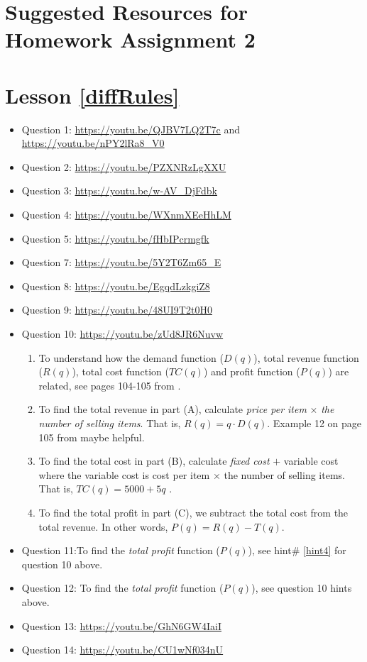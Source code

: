 \section*{Suggested Resources for Homework Assignment 2}
\section*{Lesson \ref{diffRules}}
\begin{itemize}[leftmargin=*]
    \item Question 1: \url{https://youtu.be/QJBV7LQ2T7c} and \url{https://youtu.be/nPY2lRa8_V0}
    \item Question 2: \url{https://youtu.be/PZXNRzLgXXU}
    \item Question 3: \url{https://youtu.be/w-AV_DjFdbk} 
    \item Question 4: \url{https://youtu.be/WXnmXEeHhLM}
    \item Question 5: \url{https://youtu.be/fHbIPcrmgfk}
    \item Question 7: \url{https://youtu.be/5Y2T6Zm65_E}
    \item Question 8: \url{https://youtu.be/EgqdLzkgiZ8}
    \item Question 9: \url{https://youtu.be/48UI9T2t0H0}
    \item Question 10: \url{https://youtu.be/zUd8JR6Nuvw}
    \begin{enumerate}
        \item To understand how the demand function ($D(q)$), total revenue function ($R(q)$), total cost function ($TC(q)$) and profit function ($P(q)$) are related, see pages 104-105 from \cite{Calaway} \footnotemark[1]. 
        \item To find the total revenue in part (A), calculate \emph{price per item} $\times$ \emph{the number of selling items}. That is, $R(q)=q \cdot D(q) $.  Example 12 on page 105 from \cite{Calaway} \footnotemark[1] maybe helpful.
        \item To find the total cost in part (B), calculate \emph{fixed cost} $+$ variable cost where the variable cost is cost per item $\times$ the number of selling items. That is, $TC(q)=5000+5q$ .
        \item To find the total profit in part (C), we subtract the total cost from the total revenue. In other words, $P(q)=R(q)-T(q)$. \label{hint4}
    \end{enumerate}
    \item Question 11:To find the \emph{total profit} function ($P(q)$), see hint\# \ref{hint4} for question 10 above.
    \item Question 12: To find the \emph{total profit} function ($P(q)$), see question 10 hints above.
    \item Question 13: \url{https://youtu.be/GhN6GW4IaiI}
    
    \item Question 14: \url{https://youtu.be/CU1wNf034nU}
    
\end{itemize}

